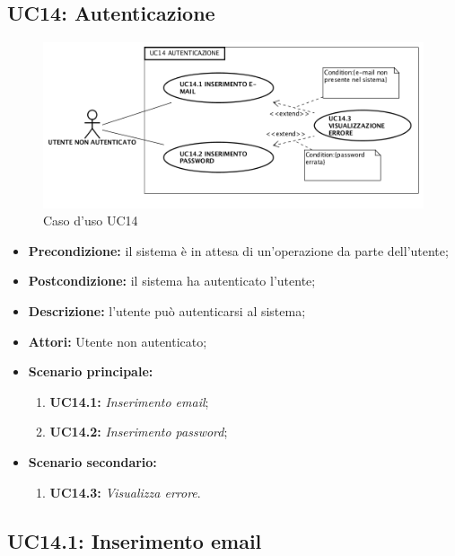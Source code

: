 \subsection{ UC14: Autenticazione}

\begin{figure}[h]
	\begin{center}
	\includegraphics[scale=0.4]{diagram/UC14.png}
	\caption{Caso d'uso UC14}
	\end{center}
\end{figure}
\begin{itemize}
	\item \textbf{Precondizione:} il sistema è in attesa di un'operazione da parte dell'utente;
	\item \textbf{Postcondizione:} il sistema ha autenticato l'utente;
	\item \textbf{Descrizione:} l'utente può autenticarsi al sistema;
	\item \textbf{Attori:} Utente non autenticato;
	\item \textbf{Scenario principale:}
	\begin{enumerate}
		\item \textbf{ UC14.1:} \textit{ Inserimento email};
		\item \textbf{ UC14.2:} \textit{ Inserimento password};
		
	\end{enumerate}
	\item \textbf{Scenario secondario:}
	\begin{enumerate}
		\item \textbf{ UC14.3:} \textit{ Visualizza errore}.
	\end{enumerate}
\end{itemize}
\subsection{ UC14.1: Inserimento email}

